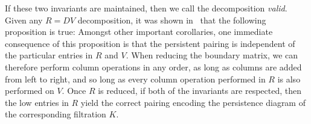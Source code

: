 \documentclass{siamart190516}
\begin{document}
 \vspace*{1em}
 If these two invariants are maintained, then we call the decomposition \emph{valid}. Given any $R = D V$ decomposition, it was shown in~\cite{zomorodian2005computing} that the following proposition is true:
\noindent
Amongst other important corollaries, one immediate consequence of this proposition is that the persistent pairing is independent of the particular entries in $R$ and $V$. When reducing the boundary matrix, we can therefore perform column operations in any order, as long as columns are added from left to right, and so long as every column operation performed in $R$ is also performed on $V$. Once $R$ is reduced, if both of the invariants are respected, then the low entries in $R$ yield the correct pairing encoding the persistence diagram of the corresponding filtration $K$.
\end{document}
